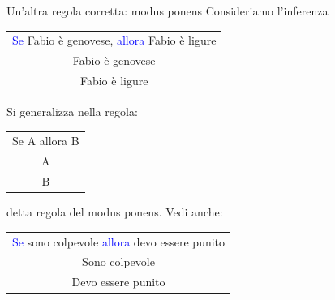 \documentclass[aspectratio=169,10pt]{beamer}
\newcommand{\conn}[1]{\textcolor{blue}{#1}}
\newenvironment{inference}{\begin{tabular}{c}}{\end{tabular}}
\begin{document}
\begin{frame}{Un'altra regola corretta: modus ponens}
	Consideriamo l'inferenza
	\begin{center}
		\begin{inference}
			\conn{Se} Fabio è genovese, \conn{allora} Fabio è ligure\\
			Fabio è genovese\\
			\hline
			Fabio è ligure
		\end{inference}
	\end{center}
	\pause
	Si generalizza nella regola:
	\begin{center}
		\begin{inference}
			Se A allora B\\
			A\\
			\hline
			B
		\end{inference}
	\end{center}
	detta \alert{regola del modus ponens}. Vedi anche:
	\begin{center}
		\begin{inference}
			\conn{Se} sono colpevole \conn{allora} devo essere punito\\
			Sono colpevole\\
			\hline
			Devo essere punito
		\end{inference}
	\end{center}
\end{frame}
\end{document}

